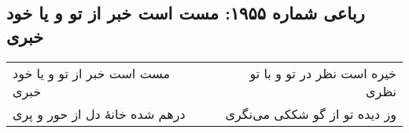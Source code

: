 \begin{center}
\section*{رباعی شماره ۱۹۵۵: مست است خبر از تو و یا خود خبری}
\label{sec:1955}
\begin{longtable}{l p{0.5cm} r}
مست است خبر از تو و یا خود خبری
&&
خیره است نظر در تو و با تو نظری
\\
درهم شده خانهٔ دل از حور و پری
&&
وز دیده تو از گو شککی می‌نگری
\\
\end{longtable}
\end{center}
